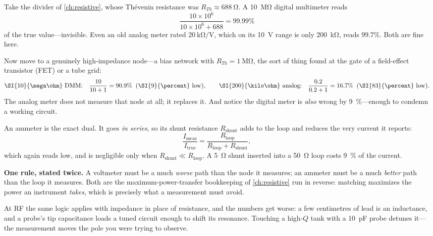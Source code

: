 \begin{workedbox}
Take the divider of \cref{ch:resistive}, whose Th\'evenin resistance was
\(R_{Th}\approx\SI{688}{\ohm}\). A \SI{10}{\mega\ohm} digital multimeter reads
\[
\frac{10\times10^6}{10\times10^6+688}=99.99\%
\]
of the true value---invisible. Even an old analog meter rated
\(\SI{20}{\kilo\ohm\per\volt}\), which on its \SI{10}{\volt} range is only
\SI{200}{\kilo\ohm}, reads \(99.7\%\). Both are fine here.

Now move to a genuinely high-impedance node---a bias network with
\(R_{Th}=\SI{1}{\mega\ohm}\), the sort of thing found at the gate of a field-effect
transistor (FET) or a tube grid:
\[
\text{\SI{10}{\mega\ohm} DMM:}\quad \frac{10}{10+1}=90.9\%
\;\;(\SI{9}{\percent}\text{ low}),
\qquad
\text{\SI{200}{\kilo\ohm} analog:}\quad \frac{0.2}{0.2+1}=16.7\%
\;\;(\SI{83}{\percent}\text{ low}).
\]
The analog meter does not measure that node at all; it replaces it. And notice the
digital meter is \emph{also} wrong by \SI{9}{\percent}---enough to condemn a working
circuit.
\end{workedbox}

An ammeter is the exact dual. It goes \emph{in series}, so its shunt resistance
\(R_{\text{shunt}}\) adds to the loop and reduces the very current it reports:
\[
\frac{I_{\text{meas}}}{I_{\text{true}}}
=\frac{R_{\text{loop}}}{R_{\text{loop}}+R_{\text{shunt}}} ,
\]
which again reads low, and is negligible only when
\(R_{\text{shunt}}\ll R_{\text{loop}}\). A \SI{5}{\ohm} shunt inserted into a
\SI{50}{\ohm} loop costs \SI{9}{\percent} of the current.

\begin{controlsbox}
\textbf{One rule, stated twice.} A voltmeter must be a much \emph{worse} path than
the node it measures; an ammeter must be a much \emph{better} path than the loop it
measures. Both are the maximum-power-transfer bookkeeping of \cref{ch:resistive} run
in reverse: matching maximizes the power an instrument \emph{takes}, which is
precisely what a measurement must avoid.
\end{controlsbox}

At RF the same logic applies with impedance in place of resistance, and the numbers
get worse: a few centimetres of lead is an inductance, and a probe's tip capacitance
loads a tuned circuit enough to shift its resonance. Touching a high-\(Q\) tank with
a \SI{10}{\pico\farad} probe detunes it---the measurement moves the pole you were
trying to observe.

